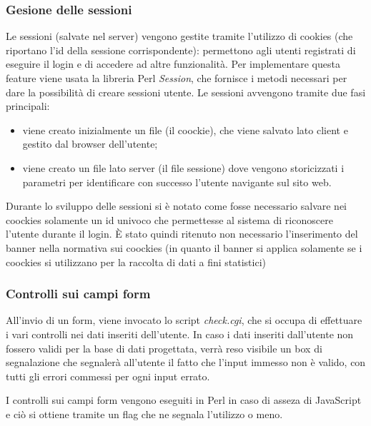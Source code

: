 \subsubsection{Gesione delle sessioni}
Le sessioni (salvate nel server) vengono gestite tramite l'utilizzo di cookies (che riportano l'id della sessione corrispondente): permettono agli utenti registrati di eseguire il login e di accedere ad altre funzionalit\`a.
Per implementare questa feature viene usata la libreria Perl \textit{Session}, che fornisce i metodi necessari per dare la possibilit\`a di creare sessioni utente. Le sessioni avvengono tramite due fasi principali:
\begin{itemize}

    \item viene creato inizialmente un file (il coockie), che viene salvato lato client e gestito dal browser dell'utente;
    \item viene creato un file lato server (il file sessione) dove vengono storicizzati i parametri per identificare con successo l'utente navigante sul sito web.

\end{itemize}

Durante lo sviluppo delle sessioni si \`e notato come fosse necessario salvare nei coockies solamente un id univoco che permettesse al sistema di riconoscere l'utente durante il login. \`E stato quindi ritenuto non necessario l'inserimento del banner nella normativa sui coockies (in quanto il banner si applica solamente se i coockies si utilizzano per la raccolta di dati a fini statistici)

\subsubsection{Controlli sui campi form}
All'invio di un form, viene invocato lo script \textit{check.cgi}, che si occupa di effettuare i vari controlli nei dati inseriti dell'utente. In caso i dati inseriti dall'utente non fossero validi per la base di dati progettata, verr\`a reso visibile un box di segnalazione che segnaler\`a all'utente il fatto che  l'input immesso non \`e valido, con tutti gli errori commessi per ogni input errato.

I controlli sui campi form vengono eseguiti in Perl in caso di asseza di JavaScript e ci\`o si ottiene tramite un flag che ne segnala l'utilizzo o meno.
